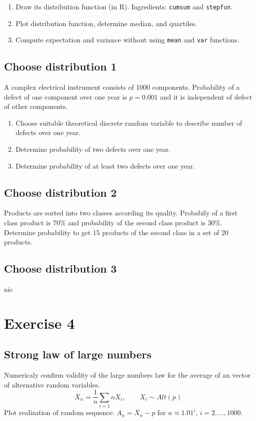 \documentclass[4pt]{article}
\def\close#1{\overline{#1}}
\begin{document}
\begin{enumerate}
 \item Draw its distribution function (in R). Ingredients: \verb'cumsum' and \verb'stepfun'.
 \item Plot distribution function, determine median, and quartiles.
 \item Compute expectation and variance without using \verb'mean' and \verb'var' functions.
\end{enumerate}

\subsection{Choose distribution 1}
A complex electrical instrument consists of 1000 components. Probability of a defect of one component over one year is $p=0.001$
and it is independent of defect of other components.
\begin{enumerate}
 \item Choose suitable theoretical discrete random variable to describe number of defects over one year. 
 \item Determine probability of two defects over one year.
 \item Determine probability of at least two defects over one year.
\end{enumerate}

\subsection{Choose distribution 2}
Products are sorted into two classes according its quality. Probabily of a first class product is 70\% and
probability of the second class product is 30\%. Determine probability to get 15 products of the second class 
in a set of 20 products.

\subsection{Choose distribution 3}



\pagebreak
nic
\pagebreak
\section{Exercise 4}

\subsection{Strong law of large numbers}
Numericaly confirm validity of the large numbers law for the average of an vector of alternative random variables.
\[
   \close{X}_n = \frac{1}{n} \sum_{i=1}{n} X_i, \qquad X_i \sim Alt(p)
\]
Plot realization of random sequence: $A_n = \close{X}_n - p$ for $n\approx 1.01^i$, $i=2,\dots,1000$.
\end{document}
